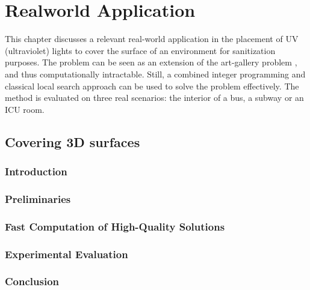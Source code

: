 
\chapter{Realworld Application}
\thispagestyle{myheadings}

This chapter discusses a relevant real-world application in the placement of UV (ultraviolet) lights 
to cover the surface of an environment for sanitization purposes. The problem can be seen as an extension
of the art-gallery problem \cite{o1987art}, and thus computationally intractable.
Still, a combined integer programming and classical local search approach can be used to
solve the problem effectively. The method is evaluated on three real scenarios: 
the interior of a bus, a subway or an ICU room. 

\section{Covering 3D surfaces}

\def\spoc{{\texttt{{SPOC}}}\xspace}
\def\osg{{\texttt{{OSG}}}\xspace}

\subsection{Introduction}

\label{sec:surf-intro}

\subsection{Preliminaries}\label{sec:surf-preliminary}



%

\subsection{Fast Computation of High-Quality Solutions}\label{sec:surf-algorithm}


\subsection{Experimental Evaluation}\label{sec:surf-evaluation}


\vspace{-1mm}
\subsection{Conclusion}\label{sec:surf-conclusion}


